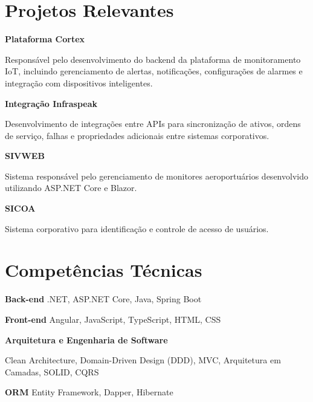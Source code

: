 \documentclass[11pt,a4paper]{article}
\begin{document}
\section{Projetos Relevantes}

\textbf{Plataforma Cortex}

Responsável pelo desenvolvimento do backend da plataforma de monitoramento IoT, incluindo gerenciamento de alertas, notificações, configurações de alarmes e integração com dispositivos inteligentes.

\vspace{0.2cm}

\textbf{Integração Infraspeak}

Desenvolvimento de integrações entre APIs para sincronização de ativos, ordens de serviço, falhas e propriedades adicionais entre sistemas corporativos.

\vspace{0.2cm}

\textbf{SIVWEB}

Sistema responsável pelo gerenciamento de monitores aeroportuários desenvolvido utilizando ASP.NET Core e Blazor.

\vspace{0.2cm}

\textbf{SICOA}

Sistema corporativo para identificação e controle de acesso de usuários.

\section{Competências Técnicas}

\textbf{Back-end}
.NET, ASP.NET Core, Java, Spring Boot

\vspace{0.15cm}

\textbf{Front-end}
Angular, JavaScript, TypeScript, HTML, CSS

\vspace{0.15cm}

\textbf{Arquitetura e Engenharia de Software}

Clean Architecture, Domain-Driven Design (DDD), MVC, Arquitetura em Camadas, SOLID, CQRS


\vspace{0.15cm}

\textbf{ORM}
Entity Framework, Dapper, Hibernate

\vspace{0.15cm}
\end{document}
